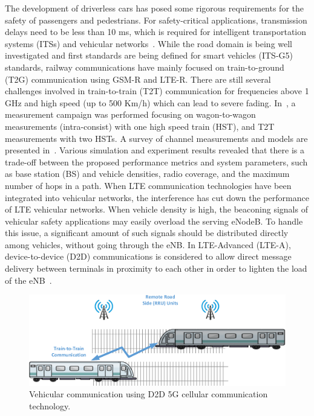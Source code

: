 The development of driverless cars has posed some rigorous requirements for the safety of passengers and pedestrians. For safety-critical applications, transmission delays need to be less than 10 ms, which is required for intelligent transportation systems (ITSs) and vehicular networks~\cite{ge2016vehicular}. While the road domain is being well investigated and first standards are being defined for smart vehicles (ITS-G5) standards, railway communications have mainly focused on train-to-ground (T2G) communication using GSM-R and LTE-R. There are still several challenges involved in train-to-train (T2T) communication for frequencies above 1 GHz and high speed (up to 500 Km/h) which can lead to severe fading. In~\cite{nterhuber2017wide}, a measurement campaign was performed focusing on wagon-to-wagon measurements (intra-consist) with one high speed train (HST), and T2T measurements with two HSTs. A survey of channel measurements and models are presented in~\cite{unterhuber2016survey}. Various simulation and experiment results revealed that there is a trade-off between the proposed performance metrics and system parameters, such as base station (BS) and vehicle densities, radio coverage, and  the  maximum number of hops in a path. When LTE communication technologies have been integrated into vehicular networks, the interference has cut down the performance of LTE vehicular networks. When vehicle density is high, the beaconing signals of vehicular safety applications may easily overload the serving eNodeB. To handle this issue, a significant amount of such signals should be distributed directly among vehicles, without  going  through  the  eNB. In  LTE-Advanced (LTE-A), device-to-device (D2D) communications is considered to allow direct message delivery between terminals in proximity to each other in order to lighten the load of the eNB~\cite{mumtaz2014direct}. 

\begin{figure}[!ht]
	\centering
\includegraphics[width=\textwidth,keepaspectratio]{images/Gill/5G/vehiclecomm.eps}
	\caption{Vehicular communication using D2D 5G cellular communication technology.}
	\label{vcomm}
\end{figure}

